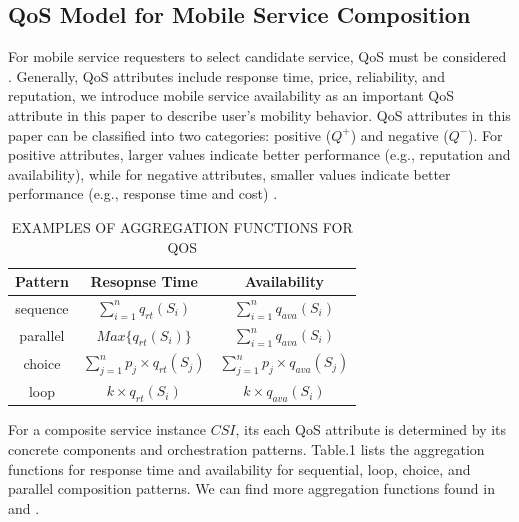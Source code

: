 \documentclass[10pt,journal,compsoc]{IEEEtran}
\begin{document}
\subsection{QoS Model for Mobile Service Composition}
For mobile service requesters to select candidate service, QoS must be considered \cite{wu2013predicting,luo2014efficient,luo2016generating}. Generally, QoS attributes include response time, price, reliability, and reputation, we introduce mobile service availability as an important QoS attribute in this paper to describe user's mobility behavior. QoS attributes in this paper can be classified into two categories: positive ($Q^+$) and negative ($Q^{-}$). For positive attributes, larger values indicate better performance (e.g., reputation and availability), while for negative attributes, smaller values indicate better performance (e.g., response time and cost) \cite{Wu2016}.	

\begin{table}[!t]
\renewcommand{\arraystretch}{1.3}
\caption{EXAMPLES OF AGGREGATION FUNCTIONS FOR QOS}
\label{table_example}
\centering
\begin{tabular}{ccc}
\hline
\bfseries Pattern & \bfseries Resopnse Time & \bfseries Availability \\
\hline
sequence & $\sum_{i=1}^{n}q_{rt}(S_i)$ & $\sum_{i=1}^{n}q_{ava}(S_i)$ \\
parallel & $Max\{q_{rt}(S_i)\}$ & $\sum_{i=1}^{n}q_{ava}(S_i)$ \\
choice & $\sum_{j=1}^{n} p_j \times q_{rt}(S_j)$ & $\sum_{j=1}^{n} p_j \times q_{ava}(S_j)$ \\
loop & $k \times q_{rt}(S_i)$ & $k \times q_{ava}(S_i)$ \\
\hline
\end{tabular}
\end{table}

For a composite service instance $CSI$, its each QoS attribute is determined by its concrete components and orchestration patterns. Table.1 lists the aggregation functions for response time and availability for sequential, loop, choice, and parallel composition patterns. We can find more aggregation functions found in \cite{jaeger2004qos} and \cite{zheng2013qos}.
\end{document}
